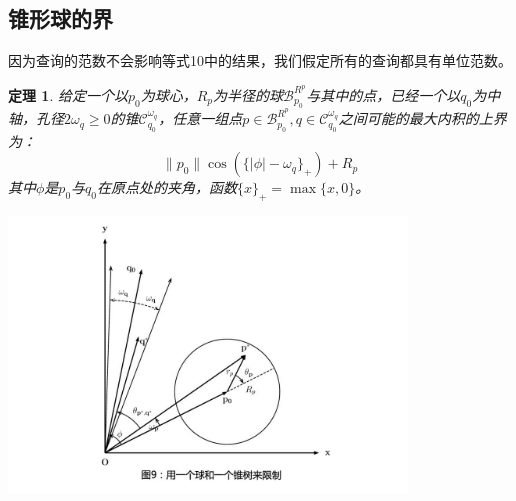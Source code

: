 \documentclass[twocolumn]{article}
\begin{document}
\subsection{锥形球的界}
因为查询的范数不会影响等式10中的结果，我们假定所有的查询都具有单位范数。
\newtheorem{theorem3}{定理}[section]
\begin{theorem3}
给定一个以$p_0$为球心，$R_p$为半径的球$\mathcal{B}_{p_0}^{R^p}$与其中的点，已经一个以$q_0$为中轴，孔径$2\omega_q \ge 0$的锥$\mathcal{C}_{q_0}^{\omega_q}$，任意一组点$p\in\mathcal{B}_{p_0}^{R^p},q\in\mathcal{C}_{q_0}^{\omega_q}$之间可能的最大内积的上界为：
\begin{equation}
\|p_0\|\cos(\{|\phi|-\omega_q\}_+)+R_p
\end{equation}
其中$\phi$是$p_0$与$q_0$在原点处的夹角，函数$\{x\}_+ = \max\{x,0\}$。
\end{theorem3}

\includegraphics[width=300pt,clip,trim=55 0 0 0]{fig09.jpg}
\end{document}
